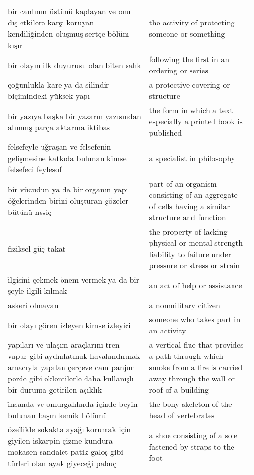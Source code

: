 \begin{longtable}{p{} p{}}
    \cmidrule(rl){1-2}
    bir canlının üstünü kaplayan ve onu dış etkilere karşı koruyan kendiliğinden oluşmuş sertçe bölüm kışır & the activity of protecting someone or something \\
    \cmidrule(rl){1-2}
    bir olayın ilk duyurusu olan biten salık & following the first in an ordering or series \\
    \cmidrule(rl){1-2}
    çoğunlukla kare ya da silindir biçimindeki yüksek yapı & a protective covering or structure \\
    \cmidrule(rl){1-2}
    bir yazıya başka bir yazarın yazısından alınmış parça aktarma iktibas & the form in which a text especially a printed book is published \\
    \cmidrule(rl){1-2}
    felsefeyle uğraşan ve felsefenin gelişmesine katkıda bulunan kimse felsefeci feylesof & a specialist in philosophy \\
    \cmidrule(rl){1-2}
    bir vücudun ya da bir organın yapı öğelerinden birini oluşturan gözeler bütünü nesiç & part of an organism consisting of an aggregate of cells having a similar structure and function \\
    \cmidrule(rl){1-2}
    fiziksel güç takat & the property of lacking physical or mental strength liability to failure under pressure or stress or strain \\
    \cmidrule(rl){1-2}
    i̇lgisini çekmek önem vermek ya da bir şeyle ilgili kılmak & an act of help or assistance \\
    \cmidrule(rl){1-2}
    askeri olmayan & a nonmilitary citizen \\
    \cmidrule(rl){1-2}
    bir olayı gören izleyen kimse izleyici & someone who takes part in an activity \\
    \cmidrule(rl){1-2}
    yapıları ve ulaşım araçlarını tren vapur gibi aydınlatmak havalandırmak amacıyla yapılan çerçeve cam panjur perde gibi eklentilerle daha kullanışlı  bir duruma getirilen açıklık & a vertical flue that provides a path through which smoke from a fire is carried away through the wall or roof of a building \\
    \cmidrule(rl){1-2}
    i̇nsanda ve omurgalılarda içinde beyin bulunan başın kemik bölümü & the bony skeleton of the head of vertebrates \\
    \cmidrule(rl){1-2}
    özellikle sokakta ayağı korumak için giyilen iskarpin çizme kundura mokasen sandalet patik galoş gibi türleri olan ayak giyeceği pabuç & a shoe consisting of a sole fastened by straps to the foot \\

\end{longtable}
